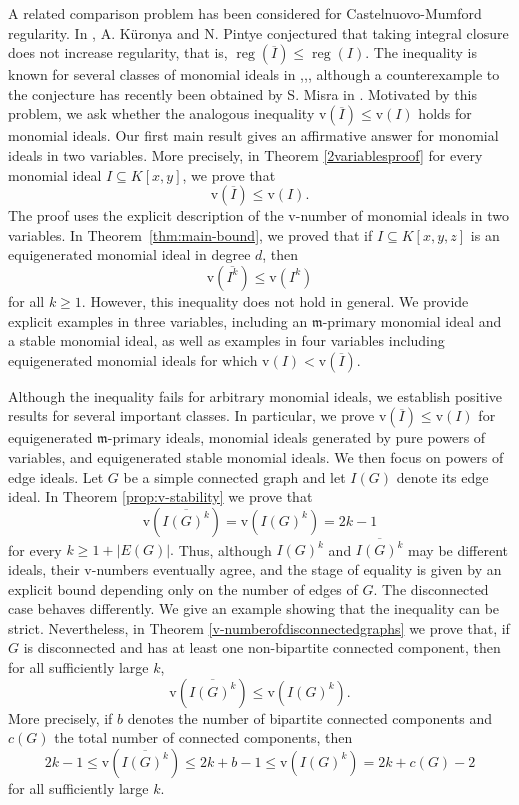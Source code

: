 \documentclass[11pt,reqno,a4paper]{amsart}
\theoremstyle{definition}
\begin{document}
A related comparison problem has been considered for
Castelnuovo-Mumford regularity. In \cite{KuronyaPintye}, A. K\"uronya and N. Pintye conjectured that
taking integral closure does not increase regularity, that is,
\(
\operatorname{reg}(\overline{I})
\leq
\operatorname{reg}(I).
\)
The inequality is known for several classes of monomial ideals in \cite{Javadekar26},\cite{KumarKumar21},\cite{MinhVu22}, although
a counterexample to the conjecture has recently been obtained by S. Misra in \cite{Misra26}. Motivated
by this problem, we ask whether the analogous inequality
\(
\mathrm{v}(\overline{I})\leq \mathrm{v}(I)
\)
holds for monomial ideals. Our first main result gives an affirmative answer for monomial ideals in
two variables. More precisely, in Theorem \ref{2variablesproof} for every monomial ideal
$I\subseteq K[x,y]$, we prove that 
\[
\mathrm{v}(\overline{I})\leq \mathrm{v}(I).
\]
The proof uses the explicit description of the $\mathrm{v}$-number of
monomial ideals in two variables. In Theorem~\ref{thm:main-bound}, we proved that if \(I \subseteq K[x,y,z]\) is an equigenerated monomial ideal in degree \(d\), then
\[
\mathrm{v}(\overline{I^k}) \le \mathrm{v}(I^k)
\]
for all \(k \ge 1\). However, this inequality does not hold in general. We
provide explicit examples in three variables, including an
$\mathfrak{m}$-primary monomial ideal and a stable monomial ideal, as well as examples in four variables including equigenerated monomial ideals for which
\(
\mathrm{v}(I)<\mathrm{v}(\overline{I}).
\)

 Although the inequality fails for arbitrary monomial ideals, we establish
positive results for several important classes. In particular, we prove \(
\mathrm{v}(\overline{I})\leq \mathrm{v}(I)
\) for equigenerated $\mathfrak{m}$-primary ideals,
monomial ideals generated by pure powers of variables, and equigenerated
stable monomial ideals. We then focus on powers of edge ideals. Let $G$ be a simple connected
graph and let $I(G)$ denote its edge ideal. In Theorem \ref{prop:v-stability} we prove that
\[
\mathrm{v}\!\left(\overline{I(G)^k}\right)
=
\mathrm{v}\!\left(I(G)^k\right)
=
2k-1
\]
for every
\(
k\geq 1+|E(G)|.
\)
Thus, although $I(G)^k$ and $\overline{I(G)^k}$ may be different ideals,
their $\mathrm{v}$-numbers eventually agree, and the stage of equality is
given by an explicit bound depending only on the number of edges of $G$. The disconnected case behaves differently. We give an example showing
that the inequality can be strict. Nevertheless, in Theorem \ref{v-numberofdisconnectedgraphs} we prove that, if $G$ is disconnected
and has at least one non-bipartite connected component, then for
all sufficiently large $k$,
\[
\mathrm{v}\!\left(\overline{I(G)^k}\right)
\leq
\mathrm{v}\!\left(I(G)^k\right).
\]
More precisely, if $b$ denotes the number of bipartite connected
components and $c(G)$ the total number of connected components, then
\[
2k-1
\leq
\mathrm{v}\!\left(\overline{I(G)^k}\right)
\leq
2k+b-1
\leq
\mathrm{v}\!\left(I(G)^k\right)
=
2k+c(G)-2
\]
for all sufficiently large $k$.
\end{document}

